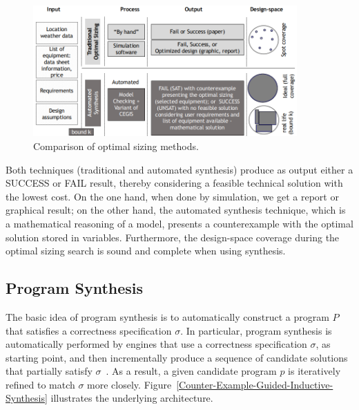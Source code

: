\documentclass[runningheads]{llncs}
\begin{document}
\begin{figure}[h]
\includegraphics[width=0.9\textwidth]{optimalsizingprocess4}
\centering
\caption{Comparison of optimal sizing methods.}
\label{fig:optimization}
\end{figure}

Both techniques (traditional and automated synthesis)  produce as output either a SUCCESS or FAIL result, thereby considering a feasible technical solution with the lowest cost. On the one hand, when done by simulation, we get a report or graphical result; on the other hand, the automated synthesis technique, which is a mathematical reasoning of a model, presents a counterexample with the optimal solution stored in variables. Furthermore, the design-space coverage during the optimal sizing search is sound and complete when using synthesis.

\subsection{Program Synthesis}
\label{sec:ProgramSynthesis}
The basic idea of program synthesis is to automatically construct a program $P$ that satisfies a correctness specification $\sigma$. In particular, program synthesis is automatically performed by engines that use a correctness specification $\sigma$, as starting point, and then incrementally produce a sequence of candidate solutions that partially satisfy $\sigma$~\cite{Abateetal2017}. As a result, a given candidate program $p$ is iteratively refined to match $\sigma$ more closely. Figure~\ref{Counter-Example-Guided-Inductive-Synthesis} illustrates the underlying architecture. 
\end{document}
